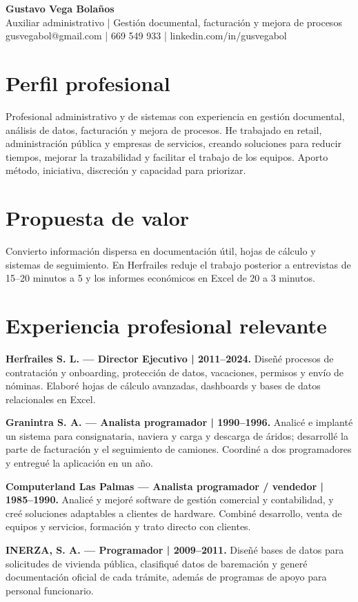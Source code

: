 \documentclass[10pt,a4paper]{article}
\begin{document}
{\fontsize{18}{20}\selectfont\textbf{Gustavo Vega Bolaños}}\\
{\fontsize{11}{13}\selectfont Auxiliar administrativo | Gestión documental, facturación y mejora de procesos}\\
{\fontsize{10.5}{12}\selectfont gusvegabol@gmail.com | 669 549 933 | linkedin.com/in/gusvegabol}
\section*{Perfil profesional}
Profesional administrativo y de sistemas con experiencia en gestión documental, análisis de datos, facturación y mejora de procesos. He trabajado en retail, administración pública y empresas de servicios, creando soluciones para reducir tiempos, mejorar la trazabilidad y facilitar el trabajo de los equipos. Aporto método, iniciativa, discreción y capacidad para priorizar.
\section*{Propuesta de valor}
Convierto información dispersa en documentación útil, hojas de cálculo y sistemas de seguimiento. En Herfrailes reduje el trabajo posterior a entrevistas de 15--20 minutos a 5 y los informes económicos en Excel de 20 a 3 minutos.
\section*{Experiencia profesional relevante}
\textbf{Herfrailes S. L. — Director Ejecutivo | 2011--2024.} Diseñé procesos de contratación y onboarding, protección de datos, vacaciones, permisos y envío de nóminas. Elaboré hojas de cálculo avanzadas, dashboards y bases de datos relacionales en Excel.

\textbf{Granintra S. A. — Analista programador | 1990--1996.} Analicé e implanté un sistema para consignataria, naviera y carga y descarga de áridos; desarrollé la parte de facturación y el seguimiento de camiones. Coordiné a dos programadores y entregué la aplicación en un año.

\textbf{Computerland Las Palmas — Analista programador / vendedor | 1985--1990.} Analicé y mejoré software de gestión comercial y contabilidad, y creé soluciones adaptables a clientes de hardware. Combiné desarrollo, venta de equipos y servicios, formación y trato directo con clientes.

\textbf{INERZA, S. A. — Programador | 2009--2011.} Diseñé bases de datos para solicitudes de vivienda pública, clasifiqué datos de baremación y generé documentación oficial de cada trámite, además de programas de apoyo para personal funcionario.
\end{document}
